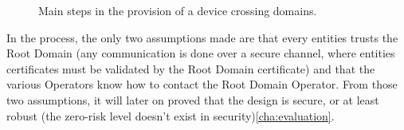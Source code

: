 \begin{figure}[!ht]
	\centering
	\qquad
	\caption{Main steps in the provision of a device crossing domains.}
	\label{fig:example}
\end{figure}

\vspace{1em}
In the process, the only two assumptions made are that every entities trusts the Root Domain (any communication is done over a secure channel, where entities certificates must be validated by the Root Domain certificate) and that the various Operators know how to contact the Root Domain Operator. From those two assumptions, it will later on proved that the design is secure, or at least robust (the zero-risk level doesn't exist in security)\ref{cha:evaluation}.

